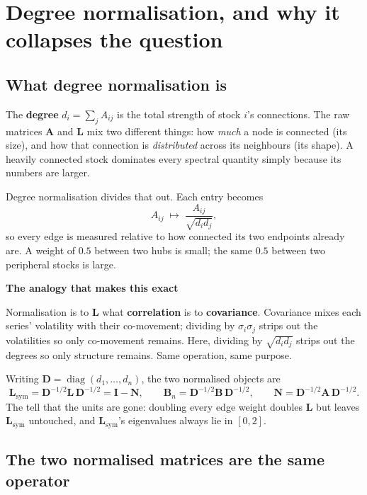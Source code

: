 \documentclass[11pt,a4paper]{article}
\newcommand{\Lap}{\mathbf{L}}
\newcommand{\Amat}{\mathbf{A}}
\newcommand{\Bmat}{\mathbf{B}}
\newcommand{\Dmat}{\mathbf{D}}
\newcommand{\Lsym}{\Lap_{\mathrm{sym}}}
\newcommand{\Bn}{\Bmat_{n}}
\newenvironment{aside}[1]
 {\par\vspace{2.5mm}\begin{lrbox}{\asidebox}%
  \begin{minipage}{\dimexpr\textwidth-16pt\relax}\small\textbf{#1}\par\vspace{1mm}}
 {\end{minipage}\end{lrbox}%
  \noindent\setlength{\fboxsep}{7pt}\setlength{\fboxrule}{.4pt}%
  \fcolorbox{Rule}{Panel2}{\usebox{\asidebox}}\par\vspace{2.5mm}}
\begin{document}
\section{Degree normalisation, and why it collapses the question}

\subsection*{What degree normalisation is}

The \textbf{degree} $d_i = \sum_j A_{ij}$ is the total strength of stock $i$'s
connections. The raw matrices $\Amat$ and $\Lap$ mix two different things: how
\emph{much} a node is connected (its size), and how that connection is
\emph{distributed} across its neighbours (its shape). A heavily connected stock
dominates every spectral quantity simply because its numbers are larger.

Degree normalisation divides that out. Each entry becomes
\[
A_{ij} \;\longmapsto\; \frac{A_{ij}}{\sqrt{d_i d_j}},
\]
so every edge is measured relative to how connected its two endpoints already
are. A weight of $0.5$ between two hubs is small; the same $0.5$ between two
peripheral stocks is large.

\begin{aside}{The analogy that makes this exact}
Normalisation is to $\Lap$ what \textbf{correlation} is to \textbf{covariance}.
Covariance mixes each series' volatility with their co-movement; dividing by
$\sigma_i\sigma_j$ strips out the volatilities so only co-movement remains. Here,
dividing by $\sqrt{d_i d_j}$ strips out the degrees so only structure remains.
Same operation, same purpose.
\end{aside}

Writing $\Dmat = \operatorname{diag}(d_1,\dots,d_n)$, the two normalised objects are
\[
\Lsym = \Dmat^{-1/2}\Lap\,\Dmat^{-1/2} = \mathbf{I} - \mathbf{N},
\qquad
\Bn = \Dmat^{-1/2}\Bmat\,\Dmat^{-1/2},
\qquad
\mathbf{N} = \Dmat^{-1/2}\Amat\,\Dmat^{-1/2}.
\]
The tell that the units are gone: doubling every edge weight doubles $\Lap$ but
leaves $\Lsym$ untouched, and $\Lsym$'s eigenvalues always lie in $[0,2]$.

\subsection*{The two normalised matrices are the same operator}
\end{document}
